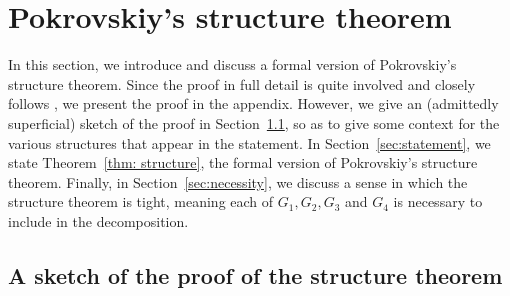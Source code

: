 \documentclass[10pt]{article}
\theoremstyle{definition}
\begin{document}
\section{Pokrovskiy's structure theorem}\label{sec:pokrovskiy}
\par In this section, we introduce and discuss a formal version of Pokrovskiy's structure theorem. Since the proof in full detail is quite involved and closely follows \cite{alexey}, we present the proof in the appendix. However, we give an (admittedly superficial) sketch of the proof in Section~\ref{sec:sketch}, so as to give some context for the various structures that appear in the statement. In Section~\ref{sec:statement}, we state Theorem~\ref{thm: structure}, the formal version of Pokrovskiy's structure theorem. Finally, in Section~\ref{sec:necessity}, we discuss a sense in which the structure theorem is tight, meaning each of $G_1,G_2,G_3$ and $G_4$ is necessary to include in the decomposition.

\subsection{A sketch of the proof of the structure theorem}\label{sec:sketch}
\end{document}
